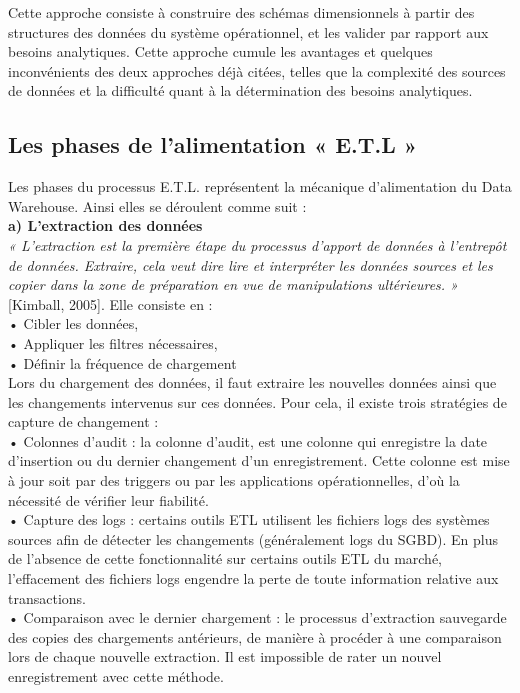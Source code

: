 Cette approche consiste à construire des schémas dimensionnels à partir des structures des données du système opérationnel, et les valider par rapport aux besoins analytiques. Cette approche cumule les avantages et quelques inconvénients des deux approches déjà citées, telles que la complexité des sources de données et la difficulté quant à la détermination des besoins analytiques.


\subsection{Les phases de l'alimentation « E.T.L »}

Les phases du processus E.T.L. représentent la mécanique d’alimentation du Data
Warehouse. Ainsi elles se déroulent comme suit :\\
\textbf{a) L’extraction des données}\\

\textit{« L’extraction est la première étape du processus d’apport de données à l’entrepôt de données. Extraire, cela veut dire lire et interpréter les données sources et les copier dans la zone de préparation en vue de manipulations ultérieures. »} [Kimball, 2005]. Elle consiste en :\\

 •	Cibler les données,\\
 •	Appliquer les filtres nécessaires,\\
 •	Définir la fréquence de chargement\\

Lors du chargement des données, il faut extraire les nouvelles données ainsi que les changements intervenus sur ces données. Pour cela, il existe trois stratégies de capture de changement :\\
• Colonnes d’audit : la colonne d’audit, est une colonne qui enregistre la date d’insertion ou du dernier changement d’un enregistrement. Cette colonne est mise à jour soit par des triggers ou par les applications opérationnelles, d’où la nécessité de vérifier leur fiabilité.\\
\quad •	Capture des logs : certains outils ETL utilisent les fichiers logs des systèmes sources afin de détecter les changements (généralement logs du SGBD). En plus de l’absence de cette fonctionnalité sur certains outils ETL du marché, l’effacement des fichiers logs engendre la perte de toute information relative aux transactions.\\
\qquad • Comparaison avec le dernier chargement : le processus d’extraction sauvegarde des copies des chargements antérieurs, de manière à procéder à une comparaison lors de chaque nouvelle extraction. Il est impossible de rater un nouvel enregistrement avec cette méthode.


